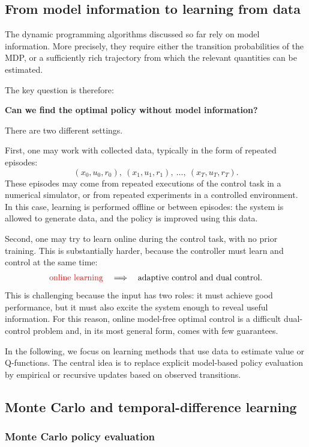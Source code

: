 \subsection{From model information to learning from data}

The dynamic programming algorithms discussed so far rely on model information. More precisely,
they require either the transition probabilities of the MDP, or a sufficiently rich trajectory from
which the relevant quantities can be estimated.

The key question is therefore:

\begin{center}
\textbf{Can we find the optimal policy without model information?}
\end{center}

There are two different settings.

First, one may work with collected data, typically in the form of repeated episodes:
\[
(x_0,u_0,r_0),\ (x_1,u_1,r_1),\ \dots,\ (x_T,u_T,r_T).
\]
These episodes may come from repeated executions of the control task in a numerical simulator,
or from repeated experiments in a controlled environment. In this case, learning is performed
offline or between episodes: the system is allowed to generate data, and the policy is improved
using this data.

Second, one may try to learn online during the control task, with no prior training. This is
substantially harder, because the controller must learn and control at the same time:
\[
\textcolor{red}{\text{online learning}} 
\quad \Longrightarrow \quad
\text{adaptive control and dual control}.
\]
This is challenging because the input has two roles: it must achieve good performance, but it
must also excite the system enough to reveal useful information. For this reason, online
model-free optimal control is a difficult dual-control problem and, in its most general form,
comes with few guarantees.

In the following, we focus on learning methods that use data to estimate value or Q-functions.
The central idea is to replace explicit model-based policy evaluation by empirical or recursive
updates based on observed transitions.

\subsection{Monte Carlo and temporal-difference learning}

\subsubsection{Monte Carlo policy evaluation}

